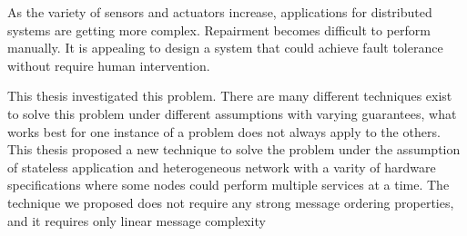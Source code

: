 \begin{abstractEN}

As the variety of sensors and actuators increase, applications for distributed systems are getting more complex. Repairment becomes difficult to perform manually. It is appealing to design a system that could achieve fault tolerance without require human intervention.

This thesis investigated this problem. There are many different techniques exist to solve this problem under different assumptions with varying guarantees, what works best for one instance of a problem does not always apply to the others. This thesis proposed a new technique to solve the problem under the assumption of stateless application and heterogeneous network with a varity of hardware specifications where some nodes could perform multiple services at a time. The technique we proposed does not require any strong message ordering properties, and it requires only linear message complexity


\end{abstractEN}

\begin{comment}

\category{I2.10}{Computing Methodologies}{Artificial Intelligence --
Vision and Scene Understanding}

\terms{System, Policy}

\keywords{Component Architecture Middleware, Fault Tolerance}

\end{comment}
